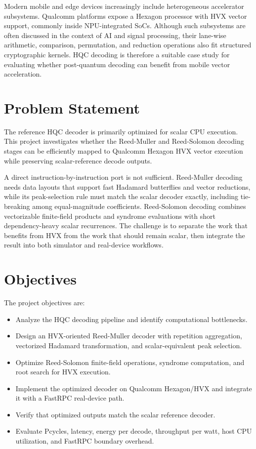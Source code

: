 \documentclass[12pt,a4paper]{report}
\begin{document}
Modern mobile and edge devices increasingly include heterogeneous accelerator subsystems. Qualcomm platforms expose a Hexagon processor with HVX vector support, commonly inside NPU-integrated SoCs. Although such subsystems are often discussed in the context of AI and signal processing, their lane-wise arithmetic, comparison, permutation, and reduction operations also fit structured cryptographic kernels. HQC decoding is therefore a suitable case study for evaluating whether post-quantum decoding can benefit from mobile vector acceleration.

\section{Problem Statement}
The reference HQC decoder is primarily optimized for scalar CPU execution. This project investigates whether the Reed-Muller and Reed-Solomon decoding stages can be efficiently mapped to Qualcomm Hexagon HVX vector execution while preserving scalar-reference decode outputs.

A direct instruction-by-instruction port is not sufficient. Reed-Muller decoding needs data layouts that support fast Hadamard butterflies and vector reductions, while its peak-selection rule must match the scalar decoder exactly, including tie-breaking among equal-magnitude coefficients. Reed-Solomon decoding combines vectorizable finite-field products and syndrome evaluations with short dependency-heavy scalar recurrences. The challenge is to separate the work that benefits from HVX from the work that should remain scalar, then integrate the result into both simulator and real-device workflows.

\section{Objectives}
The project objectives are:
\begin{itemize}
  \item Analyze the HQC decoding pipeline and identify computational bottlenecks.
  \item Design an HVX-oriented Reed-Muller decoder with repetition aggregation, vectorized Hadamard transformation, and scalar-equivalent peak selection.
  \item Optimize Reed-Solomon finite-field operations, syndrome computation, and root search for HVX execution.
  \item Implement the optimized decoder on Qualcomm Hexagon/HVX and integrate it with a FastRPC real-device path.
  \item Verify that optimized outputs match the scalar reference decoder.
  \item Evaluate Pcycles, latency, energy per decode, throughput per watt, host CPU utilization, and FastRPC boundary overhead.
\end{itemize}
\end{document}
